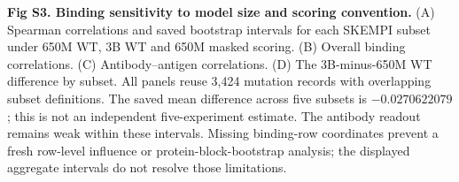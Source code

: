 \caption{{\bf Fig S3. Binding sensitivity to model size and scoring convention.} (A) Spearman correlations and saved bootstrap intervals for each SKEMPI subset under 650M WT, 3B WT and 650M masked scoring. (B) Overall binding correlations. (C) Antibody--antigen correlations. (D) The 3B-minus-650M WT difference by subset. All panels reuse 3,424 mutation records with overlapping subset definitions. The saved mean difference across five subsets is $-0.0270622079$; this is not an independent five-experiment estimate. The antibody readout remains weak within these intervals. Missing binding-row coordinates prevent a fresh row-level influence or protein-block-bootstrap analysis; the displayed aggregate intervals do not resolve those limitations.}
